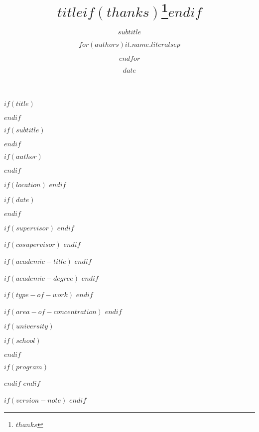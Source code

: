 $if(title)$
\title{$title$$if(thanks)$\thanks{$thanks$}$endif$}
$endif$

$if(subtitle)$
\subtitle{$subtitle$}
$endif$

$if(author)$
\author{$for(authors)$$it.name.literal$$sep$ \and $endfor$}
$endif$

$if(location)$
$endif$

$if(date)$
\date{$date$}
$endif$

$if(supervisor)$
$endif$

$if(cosupervisor)$
$endif$

$if(academic-title)$
$endif$

$if(academic-degree)$
$endif$

$if(type-of-work)$
$endif$

$if(area-of-concentration)$
$endif$

$if(university)$

$if(school)$

$endif$

$if(program)$

$endif$
$endif$

$if(version-note)$
$endif$
